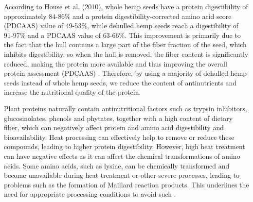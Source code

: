 \vspace{1em}
According to House et al. (2010), whole hemp seeds have a protein digestibility of approximately 84-86\% and a protein digestibility-corrected amino acid score (PDCAAS) value of 49-53\%, while dehulled hemp seeds reach a digestibility of 91-97\% and a PDCAAS value of 63-66\%. This improvement is primarily due to the fact that the hull contains a large part of the fiber fraction of the seed, which inhibits digestibility, so when the hull is removed, the fiber content is significantly reduced, making the protein more available and thus improving the overall protein assessment (PDCAAS) \cite*{house2010evaluating}. Therefore, by using a majority of dehulled hemp seeds instead of whole hemp seeds, we reduce the content of antinutrients and increase the nutritional quality of the protein.

\vspace{1em}
Plant proteins naturally contain antinutritional factors such as trypsin inhibitors, glucosinolates, phenols and phytates, together with a high content of dietary fiber, which can negatively affect protein and amino acid digestibility and bioavailability. Heat processing can effectively help to remove or reduce these compounds, leading to higher protein digestibility. However, high heat treatment can have negative effects as it can affect the chemical transformations of amino acids. Some amino acids, such as lysine, can be chemically transformed and become unavailable during heat treatment or other severe processes, leading to problems such as the formation of Maillard reaction products. This underlines the need for appropriate processing conditions to avoid such \cite*{FAO2013DietaryProteinQuality}.


